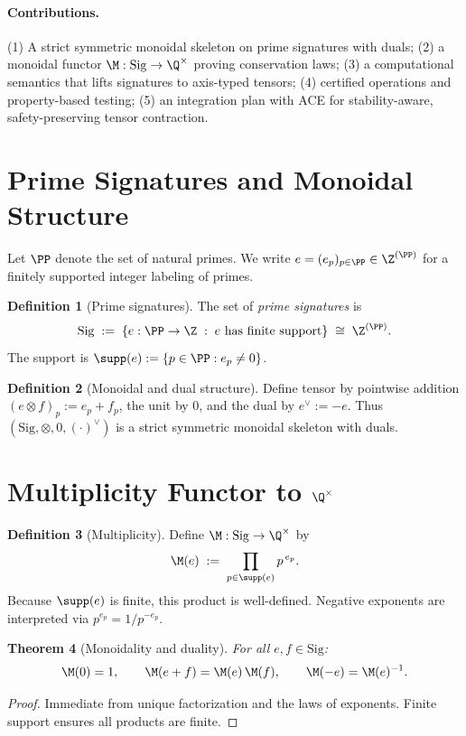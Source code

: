 \documentclass[11pt]{article}
\theoremstyle{definition}
\newtheorem{definition}{Definition}[section]
\theoremstyle{plain}
\newtheorem{theorem}[definition]{Theorem}
\theoremstyle{remark}
\newcommand{\Sig}{\mathrm{Sig}}
\begin{document}
\paragraph{Contributions.}
(1) A strict symmetric monoidal skeleton on prime signatures with duals; (2) a monoidal functor $\M:\Sig\to\Q^{\times}$ proving conservation laws; (3) a computational semantics that lifts signatures to axis-typed tensors; (4) certified operations and property-based testing; (5) an integration plan with ACE for stability-aware, safety-preserving tensor contraction.

\section{Prime Signatures and Monoidal Structure}
\label{sec:signatures}
Let $\PP$ denote the set of natural primes. We write $e=(e_p)_{p\in\PP}\in \Z^{(\PP)}$ for a finitely supported integer labeling of primes.

\begin{definition}[Prime signatures]
The set of \emph{prime signatures} is
\[
  \Sig \;:=\; \{ e:\PP\to\Z \;:\; e \text{ has finite support}\}\;\cong\;\Z^{(\PP)}.
\]
The support is $\supp(e):=\{p\in\PP: e_p\neq 0\}$.
\end{definition}

\begin{definition}[Monoidal and dual structure]
Define tensor by pointwise addition $(e\otimes f)_p := e_p+f_p$, the unit by $0$, and the dual by $e^\vee := -e$. Thus $(\Sig,\otimes,0,(\cdot)^\vee)$ is a strict symmetric monoidal skeleton with duals.
\end{definition}

\section{Multiplicity Functor to $\Q^{\times}$}
\label{sec:multiplicity}
\begin{definition}[Multiplicity]
Define $\M:\Sig\to \Q^{\times}$ by
\[
  \M(e)\;:=\; \prod_{p\in\supp(e)} p^{\,e_p}.
\]
Because $\supp(e)$ is finite, this product is well-defined. Negative exponents are interpreted via $p^{e_p}=1/p^{-e_p}$.
\end{definition}

\begin{theorem}[Monoidality and duality]
\label{thm:monoidal}
For all $e,f\in\Sig$:
\[
  \M(0)=1,\qquad \M(e+f)=\M(e)\,\M(f),\qquad \M(-e)=\M(e)^{-1}.
\]
\end{theorem}
\begin{proof}
Immediate from unique factorization and the laws of exponents. Finite support ensures all products are finite.
\end{proof}
\end{document}

